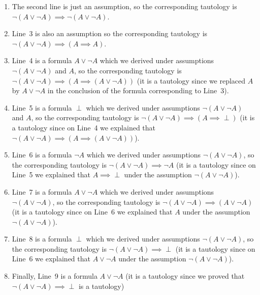 \begin{enumerate}
  \item The second line is just an assumption, so the corresponding tautology is
    $\lnot (A \lor \lnot A) \implies \lnot (A \lor \lnot A)$.
  \item Line~3 is also an assumption so the corresponding tautology is
    $\lnot (A \lor \lnot A) \implies (A \implies A)$.
  \item Line~4 is a formula $A \lor \lnot A$ which we derived under assumptions
    $\lnot (A \lor \lnot A)$ and $A$, so the corresponding tautology is
    $\lnot (A \lor \lnot A) \implies (A \implies (A \lor \lnot A))$ (it is a
    tautology since we replaced $A$ by $A \lor \lnot A$ in the conclusion of
    the formula corresponding to Line~3).
  \item Line~5 is a formula $\perp$ which we derived under assumptions
    $\lnot (A \lor \lnot A)$ and $A$, so the corresponding tautology is
    $\lnot (A \lor \lnot A) \implies (A \implies \perp)$ (it is a
    tautology since on Line~4 we explained that $\lnot (A \lor \lnot A)
    \implies (A \implies (A \lor \lnot A))$).
  \item Line~6 is a formula $\lnot A$ which we derived under assumptions
    $\lnot (A \lor \lnot A)$, so the corresponding tautology is
    $\lnot (A \lor \lnot A) \implies \lnot A$ (it is a
    tautology since on Line~5 we explained that $A \implies \perp$ under the
    assumption $\lnot (A \lor \lnot A)$).
  \item Line~7 is a formula $A \lor \lnot A$ which we derived under assumptions
    $\lnot (A \lor \lnot A)$, so the corresponding tautology is
    $\lnot (A \lor \lnot A) \implies (A \lor \lnot A)$ (it is a
    tautology since on Line~6 we explained that $A$ under the
    assumption $\lnot (A \lor \lnot A)$).
  \item Line~8 is a formula $\perp$ which we derived under assumptions
    $\lnot (A \lor \lnot A)$, so the corresponding tautology is
    $\lnot (A \lor \lnot A) \implies \perp$ (it is a
    tautology since on Line~6 we explained that $A \lor \lnot A$ under the
    assumption $\lnot (A \lor \lnot A)$).
  \item Finally, Line~9 is a formula $A \lor \lnot A$ (it is a tautology since
    we proved that $\lnot (A \lor \lnot A) \implies \perp$ is a tautology)
\end{enumerate}



